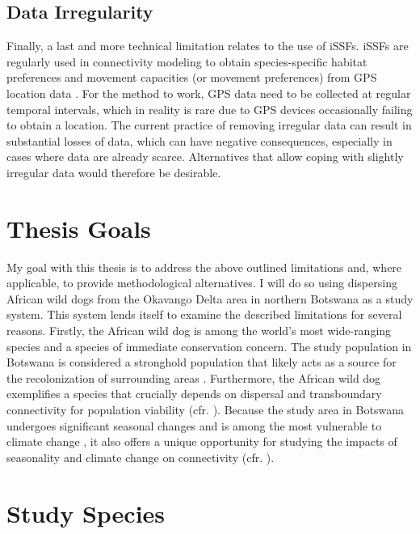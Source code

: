 \documentclass[../FinalThesis.tex]{subfiles}
\begin{document}
\subsection{Data Irregularity}

Finally, a last and more technical limitation relates to the use of iSSFs. iSSFs
are regularly used in connectivity modeling to obtain species-specific habitat
preferences and movement capacities (or movement preferences) from GPS location
data \citep{Avgar.2017, Fieberg.2021}. For the method to work, GPS data need to
be collected at regular temporal intervals, which in reality is rare due to GPS
devices occasionally failing to obtain a location. The current practice of
removing irregular data can result in substantial losses of data, which can have
negative consequences, especially in cases where data are already scarce.
Alternatives that allow coping with slightly irregular data would therefore be
desirable.

\section{Thesis Goals}

My goal with this thesis is to address the above outlined limitations and, where
applicable, to provide methodological alternatives. I will do so using
dispersing African wild dogs from the Okavango Delta area in northern Botswana
as a study system. This system lends itself to examine the described limitations
for several reasons. Firstly, the African wild dog is among the world's most
wide-ranging species and a species of immediate conservation concern. The study
population in Botswana is considered a stronghold population that likely acts as
a source for the recolonization of surrounding areas \citep{Cozzi.2013a,
Cozzi.2020}. Furthermore, the African wild dog exemplifies a species that
crucially depends on dispersal and transboundary connectivity for population
viability (cfr. ). Because the study area in Botswana
undergoes significant seasonal changes \citep{Mendelsohn.2010} and is among the
most vulnerable to climate change \citep{Akinyemi.2019, IPCC.2022}, it also
offers a unique opportunity for studying the impacts of seasonality and climate
change on connectivity (cfr. ).

\section{Study Species}
\label{StudySpecies}
\end{document}
